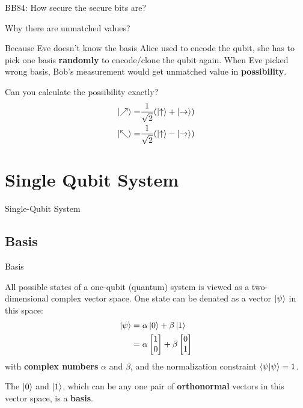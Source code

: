 \documentclass{beamer}
\begin{document}
\begin{frame}[fragile]{BB84: How secure the secure bits are?}

  \begin{block}{Why there are unmatched values?}
    {\scriptsize
      Because Eve doesn't know the basis Alice used to encode the qubit, she has to pick one basis \textbf{randomly} to encode/clone the qubit again. 
      When Eve picked wrong basis, Bob's measurement would get unmatched value in \textbf{possibility}.
      \par
      Can you calculate the possibility exactly?
      \begin{align*}
        \ket{\nearrow} =& \frac{1}{\sqrt{2}}(\ket{\uparrow} + \ket{\rightarrow}) \\
        \ket{\nwarrow} =& \frac{1}{\sqrt{2}}(\ket{\uparrow} - \ket{\rightarrow})
      \end{align*}
    }%
  \end{block}
\end{frame}

\section{Single Qubit System}
\begin{frame}
  Single-Qubit System
\end{frame}
\subsection{Basis}
\begin{frame}{Basis}
  {\tiny
    All possible states of a one-qubit (quantum) system is viewed as a two-dimensional complex vector space. One state can be denated as a vector $\ket{\psi}$ in this space:
  \begin{align*}
    \ket{\psi}&=\alpha\ket{0}+\beta\ket{1} \\
              &=\alpha\begin{bmatrix}1\\0\end{bmatrix}+\beta\begin{bmatrix}0\\1\end{bmatrix}
  \end{align*}
  with \textbf{complex numbers} $\alpha$ and $\beta$, and the normalization constraint $\braket{\psi|\psi}=1$.
  \par
  The $\ket{0}$ and $\ket{1}$, which can be any one pair of \textbf{orthonormal} vectors in this vector space, is a \textbf{basis}.
  }%
\end{frame}
\end{document}
